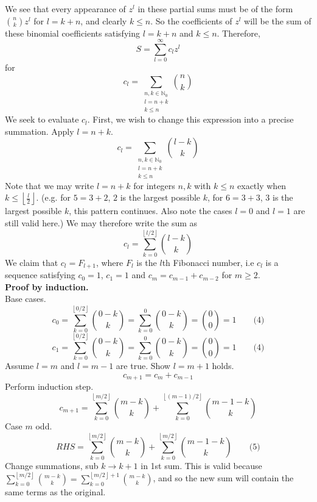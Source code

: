 \documentclass[11pt]{article}
\begin{document}
We see that every appearance of $z^l$ in these partial sums must be of the form $\displaystyle{n\choose k}z^{l}$ for $l=k+n$, and clearly $k\leq n$. So the coefficients of $z^l$ will be the sum of these binomial coefficients satisfying $l=k+n$ and $k\leq n$. Therefore,
$$S=\sum_{l=0}^{\infty}c_lz^l$$
for
$$c_l=\sum_{\substack{n,k\in \mathbb{N}_0 \\ l=n+k \\ k\leq n}} {n\choose k}$$
We seek to evaluate $c_l$. First, we wish to change this expression into a precise summation. Apply $l=n+k$.
$$c_l=\sum_{\substack{n,k\in \mathbb{N}_0 \\ l=n+k \\ k\leq n}} {l-k\choose k}$$
Note that we may write $l=n+k$ for integers $n,k$ with $k\leq n$ exactly when $\displaystyle k\leq\left\lfloor\frac{l}{2}\right\rfloor$. (e.g. for $5=3+2$, $2$ is the largest possible $k$, for $6=3+3$, $3$ is the largest possible $k$, this pattern continues. Also note the cases $l=0$ and $l=1$ are still valid here.) We may therefore write the sum as 
$$c_l=\sum_{k=0}^{\left\lfloor l/2\right\rfloor} {l-k\choose k}$$
We claim that $c_l=F_{l+1}$, where $F_l$ is the $l$th Fibonacci number, i.e $c_l$ is a sequence satisfying $c_0=1$, $c_1=1$ and $c_m=c_{m-1}+c_{m-2}$ for $m\geq 2$.\\
\textbf{Proof by induction.}\\
Base cases.
$$c_0=\sum_{k=0}^{\left\lfloor 0/2\right\rfloor} {0-k\choose k}=\sum_{k=0}^0 {0-k\choose k}={0\choose 0}=1\qquad\text{(4)}$$
$$c_1=\sum_{k=0}^{\left\lfloor 0/2\right\rfloor} {0-k\choose k}=\sum_{k=0}^0 {0-k\choose k}={0\choose 0}=1\qquad\text{(4)}$$
Assume $l=m$ and $l=m-1$ are true. Show $l=m+1$ holds.
$$c_{m+1} = c_{m}+c_{m-1}$$
Perform induction step.
$$c_{m+1}= \sum_{k=0}^{\left\lfloor m/2\right\rfloor} {m-k\choose k}+\sum_{k=0}^{\left\lfloor \left(m-1\right)/2\right\rfloor} {m-1-k\choose k}$$
Case $m$ odd. 
$$RHS=\sum_{k=0}^{\left\lfloor m/2\right\rfloor} {m-k\choose k}+\sum_{k=0}^{\left\lfloor m/2\right\rfloor} {m-1-k\choose k}\qquad\text{(5)}$$
Change summations, sub $k\rightarrow k+1$ in 1st sum. This is valid because $\sum_{k=0}^{\left\lfloor m/2\right\rfloor} {m-k\choose k}=\sum_{k=0}^{\left\lfloor m/2\right\rfloor+1} {m-k\choose k}$, and so the new sum will contain the same terms as the original.
\end{document}
